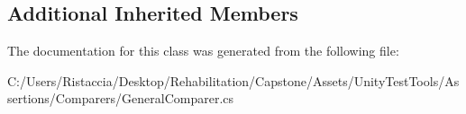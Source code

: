 \subsection*{Additional Inherited Members}


The documentation for this class was generated from the following file\+:\begin{DoxyCompactItemize}
\item 
C\+:/\+Users/\+Ristaccia/\+Desktop/\+Rehabilitation/\+Capstone/\+Assets/\+Unity\+Test\+Tools/\+Assertions/\+Comparers/General\+Comparer.\+cs\end{DoxyCompactItemize}
